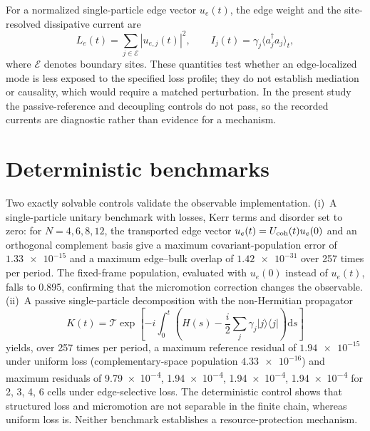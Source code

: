 \documentclass[aps,pra,preprint,superscriptaddress,amsmath,amssymb]{revtex4-2}
\newcommand{\dd}{\mathrm{d}}
\providecommand{\ketbra}[2]{|#1\rangle\langle#2|}
\begin{document}
For a normalized single-particle edge vector $u_e(t)$, the edge weight and the site-resolved dissipative current are
\begin{equation}\label{eq:mechanismobs}
L_e(t)=\sum_{j\in\mathcal{E}}|u_{e,j}(t)|^2,
\qquad I_j(t)=\gamma_j\langle a_j^\dagger a_j\rangle_t,
\end{equation}
where $\mathcal{E}$ denotes boundary sites. These quantities test whether an edge-localized mode is less exposed to the specified loss profile; they do not establish mediation or causality, which would require a matched perturbation. In the present study the passive-reference and decoupling controls do not pass, so the recorded currents are diagnostic rather than evidence for a mechanism.

\section{Deterministic benchmarks}
\label{sec:unitarybenchmark}

Two exactly solvable controls validate the observable implementation. (i)~A single-particle unitary benchmark with losses, Kerr terms and disorder set to zero: for $N=\num{4},\num{6},\num{8},\num{12}$, the transported edge vector $u_e(t)=U_{\rm coh}(t)u_e(0)$ and an orthogonal complement basis give a maximum covariant-population error of $\num{1.33e-15}$ and a maximum edge--bulk overlap of $\num{1.42e-31}$ over \num{257} times per period. The fixed-frame population, evaluated with $u_e(0)$ instead of $u_e(t)$, falls to \num{0.895}, confirming that the micromotion correction changes the observable. (ii)~A passive single-particle decomposition with the non-Hermitian propagator
\begin{equation}\label{eq:passivepropagator}
K(t)=\mathcal{T}\exp\left[-i\int_0^t
\left(H(s)-\frac{i}{2}\sum_j\gamma_j\ketbra{j}{j}\right)\dd s\right]
\end{equation}
yields, over \num{257} times per period, a maximum reference residual of $\num{1.94e-15}$ under uniform loss (complementary-space population $\num{4.33e-16}$) and maximum residuals of \num{9.79e-4}, \num{1.94e-4}, \num{1.94e-4}, \num{1.94e-4} for \num{2}, \num{3}, \num{4}, \num{6} cells under edge-selective loss. The deterministic control shows that structured loss and micromotion are not separable in the finite chain, whereas uniform loss is. Neither benchmark establishes a resource-protection mechanism.
\end{document}
